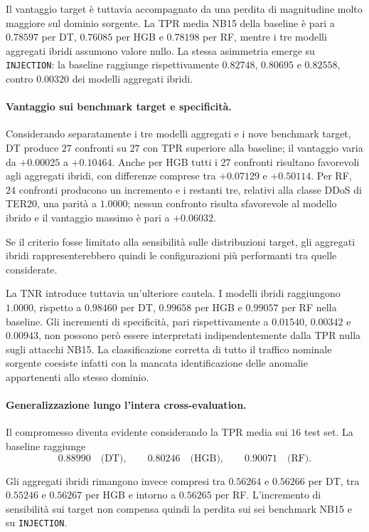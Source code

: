 Il vantaggio target è tuttavia accompagnato da una perdita di magnitudine molto maggiore sul dominio sorgente. 
La TPR media NB15 della baseline è pari a $0.78597$ per DT, $0.76085$ per HGB e $0.78198$ per RF, mentre i tre modelli aggregati ibridi assumono valore nullo. 
La stessa asimmetria emerge su \texttt{INJECTION}: la baseline raggiunge rispettivamente $0.82748$, $0.80695$ e $0.82558$, contro $0.00320$ dei modelli aggregati ibridi.

\paragraph{Vantaggio sui benchmark target e specificità.}
Considerando separatamente i tre modelli aggregati e i nove benchmark target, DT produce $27$ confronti su $27$ con TPR superiore alla baseline; il vantaggio varia da $+0.00025$ a $+0.10464$. 
Anche per HGB tutti i $27$ confronti risultano favorevoli agli aggregati ibridi, con differenze comprese tra $+0.07129$ e $+0.50114$. 
Per RF, $24$ confronti producono un incremento e i restanti tre, relativi alla classe DDoS di TER20, una parità a $1.0000$; nessun confronto risulta sfavorevole al modello ibrido e il vantaggio massimo è pari a $+0.06032$.

Se il criterio fosse limitato alla sensibilità sulle distribuzioni target, gli aggregati ibridi rappresenterebbero quindi le configurazioni più performanti tra quelle considerate.

La TNR introduce tuttavia un'ulteriore cautela. 
I modelli ibridi raggiungono $1.0000$, rispetto a $0.98460$ per DT, $0.99658$ per HGB e $0.99057$ per RF nella baseline. 
Gli incrementi di specificità, pari rispettivamente a $0.01540$, $0.00342$ e $0.00943$, non possono però essere interpretati indipendentemente dalla TPR nulla sugli attacchi NB15. 
La classificazione corretta di tutto il traffico nominale sorgente coesiste infatti con la mancata identificazione delle anomalie appartenenti allo stesso dominio.

\paragraph{Generalizzazione lungo l'intera cross-evaluation.}
Il compromesso diventa evidente considerando la TPR media sui $16$ test set.
La baseline raggiunge
\[
    0.88990 \quad \text{(DT)}, \qquad
    0.80246 \quad \text{(HGB)}, \qquad
    0.90071 \quad \text{(RF)}.
\]

Gli aggregati ibridi rimangono invece compresi tra $0.56264$ e $0.56266$ per DT, tra $0.55246$ e $0.56267$ per HGB e intorno a $0.56265$ per RF.
L'incremento di sensibilità sui target non compensa quindi la perdita sui sei benchmark NB15 e su \texttt{INJECTION}.

